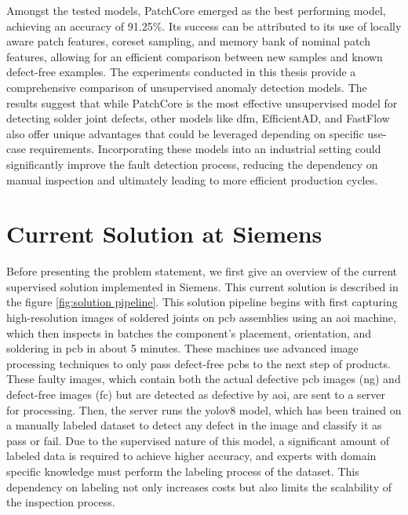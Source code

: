 Amongst the tested models, PatchCore emerged as the best performing model, achieving an accuracy of 91.25\%. Its success can be attributed to its use of locally aware patch features, coreset sampling, and memory bank of nominal patch features, allowing for an efficient comparison between new samples and known defect-free examples. The experiments conducted in this thesis provide a comprehensive comparison of unsupervised anomaly detection models. The results suggest that while PatchCore is the most effective unsupervised model for detecting solder joint defects, other models like \gls{dfm}, EfficientAD, and FastFlow also offer unique advantages that could be leveraged depending on specific use-case requirements. Incorporating these models into an industrial setting could significantly improve the fault detection process, reducing the dependency on manual inspection and ultimately leading to more efficient production cycles.

\section{Current Solution at Siemens}
\label{subsec:current solution at siemens}

Before presenting the problem statement, we first give an overview of the current supervised solution implemented in Siemens. This current solution is described in the figure \ref{fig:solution pipeline}. This solution pipeline begins with first capturing high-resolution images of soldered joints on \gls{pcb} assemblies using an \gls{aoi} machine, which then inspects in batches the component's placement, orientation, and soldering in \gls{pcb} \cite{yingxing2024} in about 5 minutes. These machines use advanced image processing techniques to only pass defect-free \glspl{pcb} to the next step of products. These faulty images, which contain both the actual defective \gls{pcb} images (\gls{ng}) and defect-free images (\gls{fc}) but are detected as defective by \gls{aoi}, are sent to a server for processing. Then, the server runs the \gls{yolo}v8 model, which has been trained on a manually labeled dataset to detect any defect in the image and classify it as pass or fail. Due to the supervised nature of this model, a significant amount of labeled data is required to achieve higher accuracy, and experts with domain specific knowledge must perform the labeling process of the dataset. This dependency on labeling not only increases costs but also limits the scalability of the inspection process.

